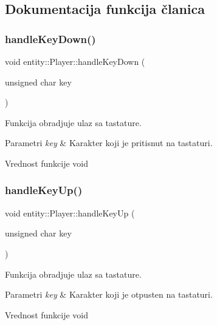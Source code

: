 \subsection{Dokumentacija funkcija članica}
\mbox{\label{classentity_1_1Player_af3d0b548d6daeb37d03f9fa57fb28f8a}} 
\subsubsection{\texorpdfstring{handle\+Key\+Down()}{handleKeyDown()}}
{\footnotesize\ttfamily void entity\+::\+Player\+::handle\+Key\+Down (\begin{DoxyParamCaption}\item[{unsigned char}]{key }\end{DoxyParamCaption})}



Funkcija obradjuje ulaz sa tastature. 


\begin{DoxyParams}{Parametri}
{\em key} & Karakter koji je pritisnut na tastaturi. \\
\hline
\end{DoxyParams}
\begin{DoxyReturn}{Vrednost funkcije}
void 
\end{DoxyReturn}
\mbox{\label{classentity_1_1Player_a27a2007873610439598c0ac07a91f3ac}} 
\subsubsection{\texorpdfstring{handle\+Key\+Up()}{handleKeyUp()}}
{\footnotesize\ttfamily void entity\+::\+Player\+::handle\+Key\+Up (\begin{DoxyParamCaption}\item[{unsigned char}]{key }\end{DoxyParamCaption})}



Funkcija obradjuje ulaz sa tastature. 


\begin{DoxyParams}{Parametri}
{\em key} & Karakter koji je otpusten na tastaturi. \\
\hline
\end{DoxyParams}
\begin{DoxyReturn}{Vrednost funkcije}
void 
\end{DoxyReturn}
\mbox{\label{classentity_1_1Player_ac4d89fa34bbc7a1a1db01db45e2da60f}} 
